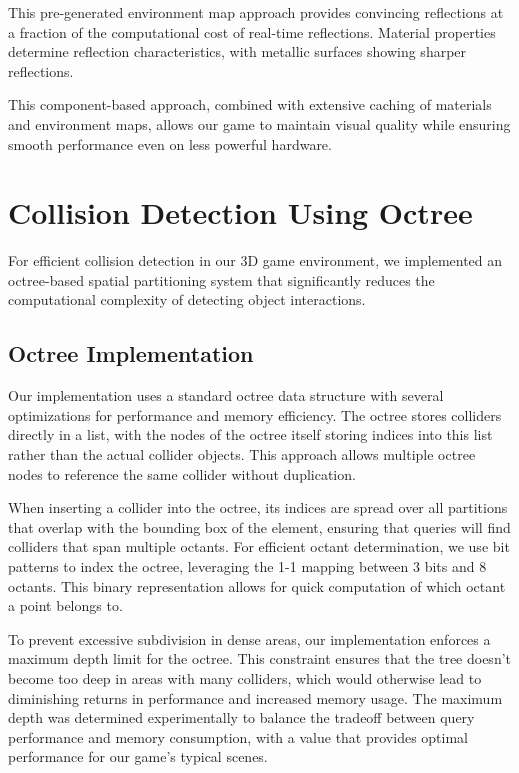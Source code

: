 \documentclass{article}
\begin{document}
This pre-generated environment map approach provides convincing reflections at a fraction of the computational cost of real-time reflections. Material properties determine reflection characteristics, with metallic surfaces showing sharper reflections.

This component-based approach, combined with extensive caching of materials and environment maps, allows our game to maintain visual quality while ensuring smooth performance even on less powerful hardware.

\section{Collision Detection Using Octree}

For efficient collision detection in our 3D game environment, we implemented an octree-based spatial partitioning system that significantly reduces the computational complexity of detecting object interactions.

\subsection{Octree Implementation}
Our implementation uses a standard octree data structure with several
optimizations for performance and memory efficiency. The octree stores
colliders directly in a list, with the nodes of the octree itself storing
indices into this list rather than the actual collider objects. This approach
allows multiple octree nodes to reference the same collider without
duplication.

When inserting a collider into the octree, its indices are spread over all
partitions that overlap with the bounding box of the element, ensuring that
queries will find colliders that span multiple octants. For efficient octant
determination, we use bit patterns to index the octree, leveraging the
1-1 mapping between 3 bits and 8 octants. This binary
representation allows for quick computation of which octant a point belongs to.

To prevent excessive subdivision in dense areas, our implementation enforces a maximum depth limit for the octree. This constraint ensures that the tree doesn't become too deep in areas with many colliders, which would otherwise lead to diminishing returns in performance and increased memory usage. The maximum depth was determined experimentally to balance the tradeoff between query performance and memory consumption, with a value that provides optimal performance for our game's typical scenes.
\end{document}
